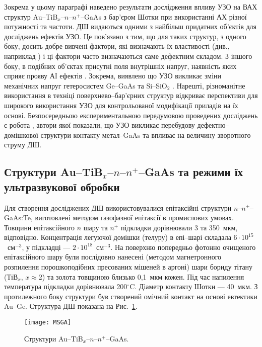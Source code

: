 \documentclass[a4paper,14pt,oneside,openany]{memoir}
\begin{document}
Зокрема у цьому параграфі наведено результати дослідження впливу УЗО
на ВАХ  структур Au--TiB$_x$--$n$--$n^+$--GaAs з бар’єром Шотки при використанні АХ різної потужності та частоти.
ДШ видаються одними з найбільш придатних об’єктів для досліджень ефектів УЗО.
Це пов’язано з тим, що для таких структур, з одного боку, досить добре вивчені фактори, які визначають їх властивості (див., наприклад \cite{Sze2012,Rhoderick1988,Singh1994,Evstropov2000,PipinsFTP})
і ці фактори часто визначаються саме дефектним складом.
З іншого боку, в подібних об’єктах присутні поля внутрішніх напруг, наявність яких сприяє прояву АІ ефектів \cite{Parchinskii2003r,Ostrov2002FTPr}.
Зокрема, виявлено що УЗО викликає зміни механічних напруг гетеросистем Ge--GaAs та Si--SiO$_2$ \cite{BritunFTT,Zdeb1989}.
Нарешті, різноманітне використання в техніці поверхнево--бар’єрних структур відкриває перспективи для широкого використання УЗО для контрольованої модифікації приладів на їх основі.
Безпосередньою експериментальною передумовою проведених досліджень є робота \cite{UST:SDErmol},
автори якої показали, що УЗО викликає перебудову дефектно--домішкової структури контакту метал--GaAs та впливає на величину зворотного струму ДШ.


\subsection{Структури Au--TiB$_x$--$n$--$n^+$--GaAs та режими їх ультразвукової обробки}


Для створення досліджених ДШ використовувалися епітаксійні структури $n$--$n^+$--GaAs:Te,
виготовлені методом газофазної епітаксії в промислових умовах.
Товщини епітаксійного $n$ шару та $n^+$ підкладки дорівнювали 3 та 350~мкм, відповідно.
Концентрація легуючої домішки (телуру) в епі--шарі складала $6\cdot10^{15}$~см$^{-3}$,
у підкладці --- $2\cdot10^{18}$~см$^{-3}$.
На поверхню попередньо фотонно очищеного епітаксійного шару були послідовно нанесені
(методом магнетронного розпилення порошкоподібних пресованих мішеней в аргоні)
шари бориду тітану (ТіВ$_x$, $x\approx2$) та золота товщиною близько 0,1~мкм кожен.
Під час напилення температура підкладки дорівнювала 200$^\circ$C.
Діаметр контакту Шотки --- 40~мкм.
З протилежного боку структури був створений омічний контакт на основі евтектики Au--Ge.
Структура ДШ показана на Рис.~\ref{figMSGA}.

\begin{figure}%
\center
\texttt{[image: MSGA]}%
\caption{\label{figMSGA}
Структури Au--TiB$_x$--$n$--$n^+$--GaAs.
}
\end{figure}
\end{document}
